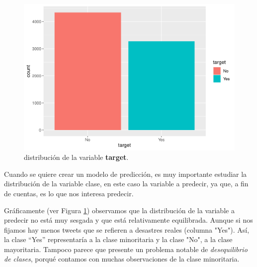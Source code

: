\documentclass[]{article}
\newenvironment{Shaded}{\begin{snugshade}}{\end{snugshade}}
\newcommand{\DataTypeTok}[1]{\textcolor[rgb]{0.13,0.29,0.53}{#1}}
\newcommand{\DecValTok}[1]{\textcolor[rgb]{0.00,0.00,0.81}{#1}}
\newcommand{\KeywordTok}[1]{\textcolor[rgb]{0.13,0.29,0.53}{\textbf{#1}}}
\newcommand{\NormalTok}[1]{#1}
\newcommand{\OperatorTok}[1]{\textcolor[rgb]{0.81,0.36,0.00}{\textbf{#1}}}
\newcommand{\StringTok}[1]{\textcolor[rgb]{0.31,0.60,0.02}{#1}}
\begin{document}
\vspace{3mm}

\begin{Shaded}
\end{Shaded}

\renewcommand{\figurename}{Figura}

\begin{figure}
	\begin{center}
		\includegraphics[width=0.7\linewidth]{document_files/figure-latex/unnamed-chunk-4-1} 
		\caption{distribución de la variable \textbf{target}.}
		\label{fig: distribución de la variable target}
	\end{center}
\end{figure}

Cuando se quiere crear un modelo de predicción, es muy importante estudiar la distribución de
la variable clase, en este caso la variable a predecir, ya que, a fin de cuentas, es lo que nos interesa
predecir.

Gráficamente (ver Figura \ref{fig: distribución de la variable target}) observamos que la distribución de la variable a predecir no está muy sesgada y que está relativamente equilibrada. Aunque si nos fijamos hay menos tweets que se refieren a desastres reales (columna "Yes"). Así, la clase ``Yes'' representaría a la clase minoritaria y la clase "No", a la clase mayoritaria. Tampoco parece que presente un problema notable de \emph{desequilibrio de clases}, porqué contamos con muchas observaciones de la clase minoritaria.
\end{document}
